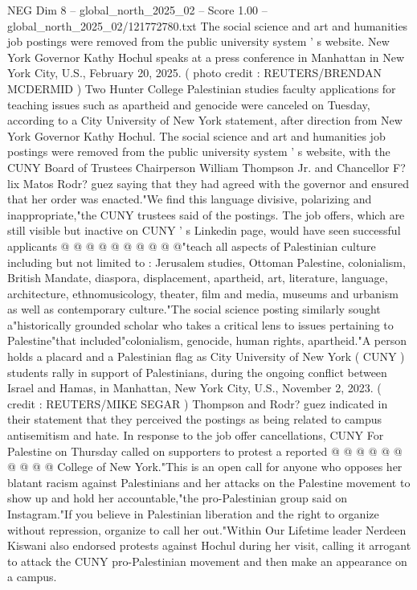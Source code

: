 \begin{textsample}{NEG Dim 8 – global\_north\_2025\_02 – Score 1.00 – global\_north\_2025\_02/121772780.txt}  \label{ex:f8_neg_437}
The social science and art and humanities job postings were removed from the public university system ' s website.
New York Governor Kathy Hochul speaks at a press conference in Manhattan in New York City, U.S., February 20, 2025. ( photo credit : REUTERS/BRENDAN MCDERMID ) Two Hunter College Palestinian studies faculty applications for teaching issues such as apartheid and genocide were canceled on Tuesday, according to a City University of New York statement, after direction from New York Governor Kathy Hochul.
The social science and art and humanities job postings were removed from the public university system ' s website, with the CUNY Board of Trustees Chairperson William Thompson Jr. and Chancellor F? lix Matos Rodr? guez saying that they had agreed with the governor and ensured that her order was enacted."We find this language divisive, polarizing and inappropriate,"the CUNY trustees said of the postings.
The job offers, which are still visible but inactive on CUNY ' s Linkedin page, would have seen successful applicants @ @ @ @ @ @ @ @ @ @"teach all aspects of Palestinian culture including but not limited to : Jerusalem studies, Ottoman Palestine, colonialism, British Mandate, diaspora, displacement, apartheid, art, literature, language, architecture, ethnomusicology, theater, film and media, museums and urbanism as well as contemporary culture."The social science posting similarly sought a"historically grounded scholar who takes a critical lens to issues pertaining to Palestine"that included"colonialism, genocide, human rights, apartheid."A person holds a placard and a Palestinian flag as City University of New York ( CUNY ) students rally in support of Palestinians, during the ongoing conflict between Israel and Hamas, in Manhattan, New York City, U.S., November 2, 2023. ( credit : REUTERS/MIKE SEGAR ) Thompson and Rodr? guez indicated in their statement that they perceived the postings as being related to campus antisemitism and hate.
In response to the job offer cancellations, CUNY For Palestine on Thursday called on supporters to protest a reported @ @ @ @ @ @ @ @ @ @ College of New York."This is an open call for anyone who opposes her blatant racism against Palestinians and her attacks on the Palestine movement to show up and hold her accountable,"the pro-Palestinian group said on Instagram."If you believe in Palestinian liberation and the right to organize without repression, organize to call her out."Within Our Lifetime leader Nerdeen Kiswani also endorsed protests against Hochul during her visit, calling it arrogant to attack the CUNY pro-Palestinian movement and then make an appearance on a campus.

\end{textsample}
